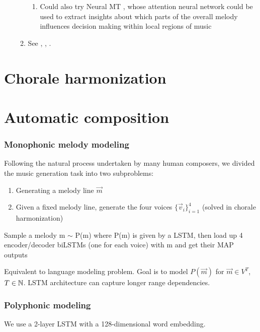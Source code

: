 \documentclass[a4paper,12pt,twoside,openright]{report}
\begin{document}
\begin{enumerate}
\begin{enumerate}
\begin{enumerate}
                    \item Could also try Neural MT \cite{Bahdanau2015}, whose attention
                        neural network could be used to extract insights about which parts
                        of the overall melody influences decision making within local regions
                        of music
                \end{enumerate}
            \item See \cite{Liu2014}, \cite{Auli2013}, \cite{Sutskever2014}.
        \end{enumerate}
\end{enumerate}

\chapter{Chorale harmonization}

\chapter{Automatic composition}

\subsection{Monophonic melody modeling}

Following the natural process undertaken by many human composers, we divided
the music generation task into two subproblems:
\begin{enumerate}
    \item Generating a melody line $\vec{m}$
    \item Given a fixed melody line, generate the four voices $\{\vec{v}_i\}_{i=1}^4$ (solved in chorale harmonization)
\end{enumerate}

Sample a melody m $\sim$ P(m) where P(m) is given by a LSTM, then load up 4
encoder/decoder biLSTMs (one for each voice) with m and get their MAP outputs

Equivalent to language modeling problem. Goal is to model $P(\vec{m})$ for $\vec{m}
\in V^T$, $T \in \mathbb{N}$. LSTM architecture can capture longer range dependencies.

\subsection{Polyphonic modeling}

We use a 2-layer LSTM with a 128-dimensional word embedding.
\end{document}
